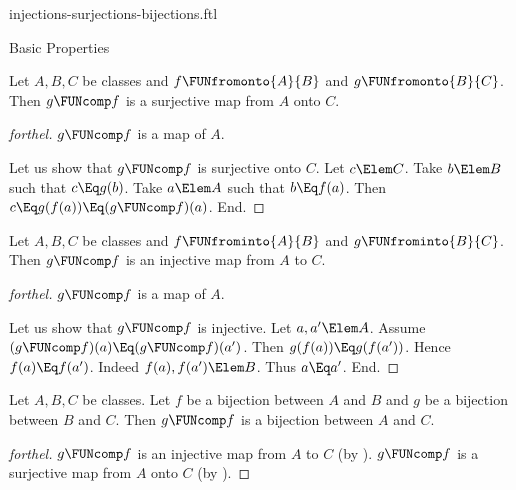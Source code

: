 \documentclass{stex}
\begin{document}
\begin{smodule}{injections-surjections-bijections.ftl}
\begin{sfragment}{Basic Properties}

  \begin{proposition}[forthel,name=surjectivity of composition of surjections]
    Let $A, B, C$ be classes and $f \FUNfromonto{A}{B}$ and $g \FUNfromonto{B}{C}$.
    Then $g \FUNcomp f$ is a surjective map from $A$ onto $C$.
  \end{proposition}
  \begin{proof}[forthel]
    $g \FUNcomp f$ is a map of $A$.

    Let us show that $g \FUNcomp f$ is surjective onto $C$.
      Let $c \Elem C$.
      Take $b \Elem B$ such that $c \Eq g(b)$.
      Take $a \Elem A$ such that $b \Eq f(a)$.
      Then $c \Eq g(f(a)) \Eq (g \FUNcomp f)(a)$.
    End.
  \end{proof}


  \begin{proposition}[forthel,name=injectivity of composition of injections]
    Let $A, B, C$ be classes and $f \FUNfrominto{A}{B}$ and $g \FUNfrominto{B}{C}$.
    Then $g \FUNcomp f$ is an injective map from $A$ to $C$.
  \end{proposition}
  \begin{proof}[forthel]
    $g \FUNcomp f$ is a map of $A$.

    Let us show that $g \FUNcomp f$ is injective.
      Let $a, a' \Elem A$.
      Assume $(g \FUNcomp f)(a) \Eq (g \FUNcomp f)(a')$.
      Then $g(f(a)) \Eq g(f(a'))$.
      Hence $f(a) \Eq f(a')$.
      Indeed $f(a), f(a') \Elem B$.
      Thus $a \Eq a'$.
    End.
  \end{proof}


  \begin{corollary}[forthel,name=bijectivity of composition of bijections]
    Let $A, B, C$ be classes.
    Let $f$ be a bijection between $A$ and $B$ and $g$ be a bijection between $B$ and $C$.
    Then $g \FUNcomp f$ is a bijection between $A$ and $C$.
  \end{corollary}
  \begin{proof}[forthel]
    $g \FUNcomp f$ is an injective map from $A$ to $C$ (by ).
    $g \FUNcomp f$ is a surjective map from $A$ onto $C$ (by ).
  \end{proof}


\end{sfragment}
\end{smodule}
\end{document}
